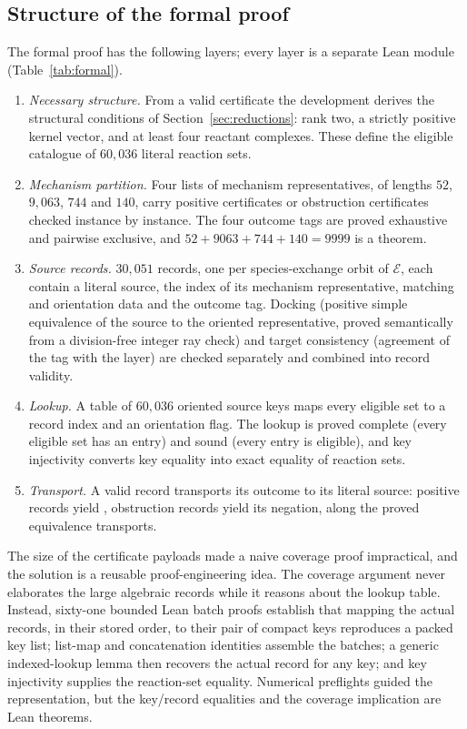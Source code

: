 \documentclass[11pt,a4paper]{article}
\theoremstyle{plain}
\theoremstyle{definition}
\theoremstyle{remark}
\numberwithin{equation}{section}
\newcommand{\Eligible}{\mathcal{E}}
\begin{document}
\subsection{Structure of the formal proof}
The formal proof has the following layers; every layer is a separate Lean module (Table~\ref{tab:formal}).
\begin{enumerate}[label=\textup{(\arabic*)}]
\item \emph{Necessary structure.} From a valid certificate the development derives the structural conditions of Section~\ref{sec:reductions}: rank two, a strictly positive kernel vector, and at least four reactant complexes. These define the eligible catalogue of $60{,}036$ literal reaction sets.
\item \emph{Mechanism partition.} Four lists of mechanism representatives, of lengths $52$, $9{,}063$, $744$ and $140$, carry positive certificates or obstruction certificates checked instance by instance. The four outcome tags are proved exhaustive and pairwise exclusive, and $52+9063+744+140=9999$ is a theorem.
\item \emph{Source records.} $30{,}051$ records, one per species-exchange orbit of $\Eligible$, each contain a literal source, the index of its mechanism representative, matching and orientation data and the outcome tag. Docking (positive simple equivalence of the source to the oriented representative, proved semantically from a division-free integer ray check) and target consistency (agreement of the tag with the layer) are checked separately and combined into record validity.
\item \emph{Lookup.} A table of $60{,}036$ oriented source keys maps every eligible set to a record index and an orientation flag. The lookup is proved complete (every eligible set has an entry) and sound (every entry is eligible), and key injectivity converts key equality into exact equality of reaction sets.
\item \emph{Transport.} A valid record transports its outcome to its literal source: positive records yield , obstruction records yield its negation, along the proved equivalence transports.
\end{enumerate}

The size of the certificate payloads made a naive coverage proof impractical, and the solution is a reusable proof-engineering idea. The coverage argument never elaborates the large algebraic records while it reasons about the lookup table. Instead, sixty-one bounded Lean batch proofs establish that mapping the actual records, in their stored order, to their pair of compact keys reproduces a packed key list; list-map and concatenation identities assemble the batches; a generic indexed-lookup lemma then recovers the actual record for any key; and key injectivity supplies the reaction-set equality. Numerical preflights guided the representation, but the key/record equalities and the coverage implication are Lean theorems.
\end{document}
